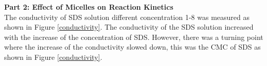 \documentclass[twocolumn]{article} %
\begin{document}

\textbf{Part 2: Effect of Micelles on Reaction Kinetics}\\

The conductivity of SDS solution different concentration 1-8 was measured as shown in Figure \ref{conductivity}. The conductivity of the SDS solution increased with the increase of the concentration of SDS. However, there was a turning point where the increase of the conductivity slowed down, this was the CMC of SDS as shown in Figure \ref{conductivity}. 
\end{document}
